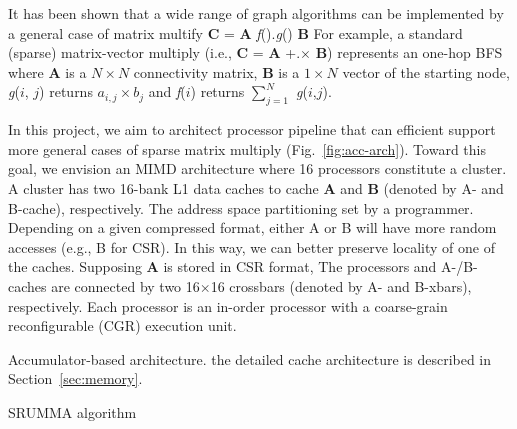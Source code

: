 %

\noindent
It has been shown that a wide range of graph algorithms can be implemented by a general case of matrix multify \textbf{C} = \textbf{A} \textit{f}().\textit{g}() \textbf{B} 
For example, a standard (sparse) matrix-vector multiply (i.e., \textbf{C} = \textbf{A} +.$\times$ \textbf{B}) represents an one-hop BFS 
where \textbf{A} is a $N \times N$ connectivity matrix, \textbf{B} is a $1 \times N$ vector of the starting node, 
\textit{g}($i$, $j$) returns $a_{i,j} \times b_{j}$ and \textit{f}($i$) returns $\sum_{j=1}^{N}$ \textit{g}($i$,$j$).

In this project, we aim to architect processor pipeline that can efficient support more general cases of sparse matrix multiply (Fig.~\ref{fig:acc-arch}).
Toward this goal, we envision an MIMD architecture where 16 processors constitute a cluster.
A cluster has two 16-bank L1 data caches to cache \textbf{A} and \textbf{B} (denoted by A- and B-cache), respectively.
The address space partitioning set by a programmer.
Depending on a given compressed format, either A or B will have more random accesses (e.g., B for CSR).
In this way, we can better preserve locality of one of the caches.
Supposing \textbf{A} is stored in CSR format, 
The processors and A-/B-caches are connected by two 16$\times$16 crossbars (denoted by A- and B-xbars), respectively.
Each processor is an in-order processor with a coarse-grain reconfigurable (CGR) execution unit.

Accumulator-based architecture.
the detailed cache architecture is described in Section~\ref{sec:memory}.

SRUMMA algorithm
% 


